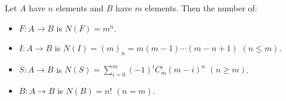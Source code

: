 Let $A$ have $n$ elements and $B$ have $m$ elements. Then the number of:
\begin{itemize}
\item {} $F: A \to B$ is $N(F) = m^n$.
\item {} $I: A \to B$ is $N(I) = (m)_n = m(m-1)\cdots(m-n+1)$ \quad $(n \leq m)$.
\item {} $S: A \to B$ is $N(S) = \sum_{i=0}^{m} (-1)^i C_m^i (m-i)^n$ \quad $(n \geq m)$.
\item {} $B: A \to B$ is $N(B) = n!$ \quad $(n = m)$.
\end{itemize}
